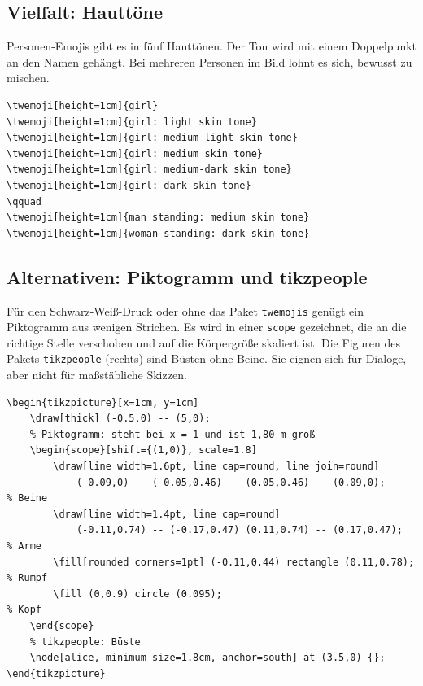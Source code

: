 \subsection{Vielfalt: Hauttöne}

Personen-Emojis gibt es in fünf Hauttönen. Der Ton wird mit einem Doppelpunkt an den Namen gehängt. Bei mehreren Personen im Bild lohnt es sich, bewusst zu mischen.

\begin{lstlisting}[style=latex]
\twemoji[height=1cm]{girl}
\twemoji[height=1cm]{girl: light skin tone}
\twemoji[height=1cm]{girl: medium-light skin tone}
\twemoji[height=1cm]{girl: medium skin tone}
\twemoji[height=1cm]{girl: medium-dark skin tone}
\twemoji[height=1cm]{girl: dark skin tone}
\qquad
\twemoji[height=1cm]{man standing: medium skin tone}
\twemoji[height=1cm]{woman standing: dark skin tone}
\end{lstlisting}

\begin{ausgabe}
\centering
	\qquad
\end{ausgabe}


\subsection{Alternativen: Piktogramm und tikzpeople}

Für den Schwarz-Weiß-Druck oder ohne das Paket \texttt{twemojis} genügt ein Piktogramm aus wenigen Strichen. Es wird in einer \texttt{scope} gezeichnet, die an die richtige Stelle verschoben und auf die Körpergröße skaliert ist. Die Figuren des Pakets \texttt{tikzpeople} (rechts) sind Büsten ohne Beine. Sie eignen sich für Dialoge, aber nicht für maßstäbliche Skizzen.

\begin{lstlisting}[style=latex]
\begin{tikzpicture}[x=1cm, y=1cm]
	\draw[thick] (-0.5,0) -- (5,0);
	% Piktogramm: steht bei x = 1 und ist 1,80 m groß
	\begin{scope}[shift={(1,0)}, scale=1.8]
		\draw[line width=1.6pt, line cap=round, line join=round]
			(-0.09,0) -- (-0.05,0.46) -- (0.05,0.46) -- (0.09,0);       % Beine
		\draw[line width=1.4pt, line cap=round]
			(-0.11,0.74) -- (-0.17,0.47) (0.11,0.74) -- (0.17,0.47);   % Arme
		\fill[rounded corners=1pt] (-0.11,0.44) rectangle (0.11,0.78); % Rumpf
		\fill (0,0.9) circle (0.095);                                  % Kopf
	\end{scope}
	% tikzpeople: Büste
	\node[alice, minimum size=1.8cm, anchor=south] at (3.5,0) {};
\end{tikzpicture}
\end{lstlisting}

